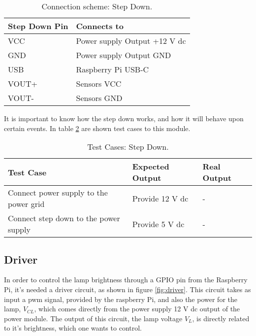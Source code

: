 \begin{table}[H]
	\centering
	\begin{tabular}{|m{5cm}|m{6cm}|}
		\hline
		\textbf{Step Down Pin} & \textbf{Connects to}
		\\\hline\hline
		
		VCC & Power supply Output +12 V \ac{dc}
		\\\hline
		GND & Power supply Output GND
		\\\hline
		USB & Raspberry Pi USB-C
		\\\hline
		VOUT+ & Sensors VCC
		\\\hline
		VOUT- & Sensors GND
		\\\hline
	\end{tabular}
	
	\caption{Connection scheme: Step Down.}
	\label{table:connect_power}
\end{table}

It is important to know how the step down works, and how it will behave upon certain events. In table \ref{table:test_step_down} are shown test cases to this module.

\begin{table}[H]
	\centering
	\resizebox{\columnwidth}{!}
	{
		\begin{tabular}{|m{3cm}|m{5cm}||m{5cm}|}
			\hline
			\textbf{Test Case} & \textbf{Expected Output} & \textbf{Real Output}
			\\\hline\hline
			Connect power supply to the power grid & Provide 12 V \ac{dc} & -
			\\\hline
			Connect step down to the power supply & Provide 5 V \ac{dc} & -
			\\\hline
		\end{tabular}
	}
	\caption{Test Cases: Step Down.}
	\label{table:test_step_down}
\end{table}
\subsection{Driver}
In order to control the lamp brightness through a GPIO pin from the Raspberry Pi, it's needed a driver circuit, as shown in figure \ref{fig:driver}. This circuit takes as input a \ac{pwm} signal, provided by the raspberry Pi, and also the power for the lamp, \(V_{CL}\), which comes directly from the power supply 12 V \ac{dc} output of the power module. The output of this circuit, the lamp voltage \(V_{L}\), is directly related to it's brightness, which one wants to control.

